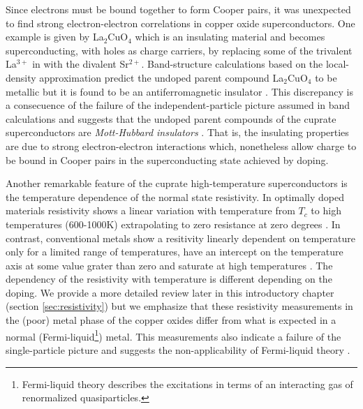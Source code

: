 Since electrons must be bound together to form Cooper pairs, it was unexpected to find strong electron-electron correlations in copper oxide superconductors. 
One example is given by La$_2$CuO$_4$ which is an insulating material and becomes superconducting, with holes as charge carriers, by replacing some of the trivalent La$^{3+}$ in with the divalent Sr$^{2+}$. 
Band-structure calculations based on the local-density approximation predict the undoped parent compound La$_2$CuO$_4$ to be metallic but it is found to be an antiferromagnetic insulator \cite{Timusk1999}.
This discrepancy is a consecuence of the failure of the independent-particle picture assumed in band calculations and suggests that the undoped parent compounds of the cuprate superconductors are \textit{Mott-Hubbard insulators} \cite{Mott1949}.
That is, the insulating properties are due to strong electron-electron interactions which, nonetheless allow charge to be bound in Cooper pairs in the superconducting state achieved by doping.

Another remarkable feature of the cuprate high-temperature superconductors is the temperature dependence of the normal state resistivity.
In optimally doped materials resistivity shows a linear variation with temperature from $T_c$ to high temperatures (600-1000K) extrapolating to zero resistance at zero degrees \cite{Gurvitch1987}.
In contrast, conventional metals show a resitivity linearly dependent on temperature only for a limited range of temperatures, have an intercept on the temperature axis at some value grater than zero and saturate at high temperatures \cite{Timusk1999}.
The dependency of the resistivity with temperature is different depending on the doping. 
We provide a more detailed review later in this introductory chapter (section \ref{sec:resistivity}) but we emphasize that these resistivity measurements in the (poor) metal phase of the copper oxides differ from what is expected in a normal (Fermi-liquid\footnote{Fermi-liquid theory describes the excitations in terms of an interacting gas of renormalized quasiparticles.}) metal.
This measurements also indicate a failure of the single-particle picture and suggests the non-applicability of Fermi-liquid theory \cite{Orenstein2000}.

